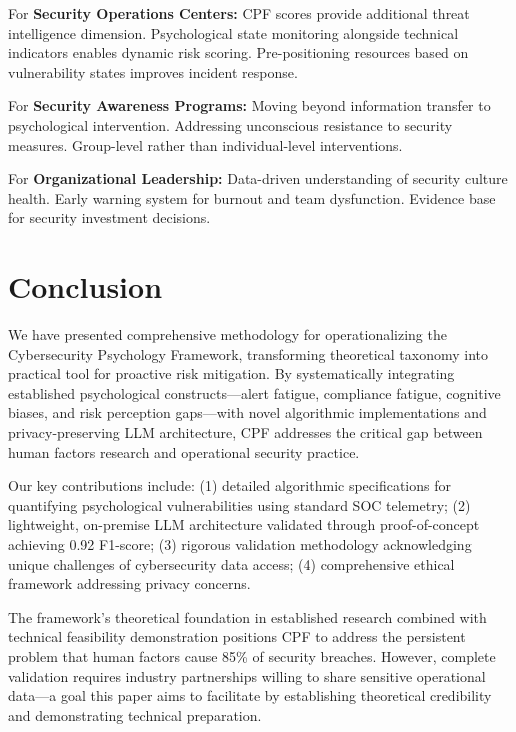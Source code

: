 \documentclass[11pt, a4paper]{article}
\begin{document}
For \textbf{Security Operations Centers:} CPF scores provide additional threat intelligence dimension. Psychological state monitoring alongside technical indicators enables dynamic risk scoring. Pre-positioning resources based on vulnerability states improves incident response.

For \textbf{Security Awareness Programs:} Moving beyond information transfer to psychological intervention. Addressing unconscious resistance to security measures. Group-level rather than individual-level interventions.

For \textbf{Organizational Leadership:} Data-driven understanding of security culture health. Early warning system for burnout and team dysfunction. Evidence base for security investment decisions.

\section{Conclusion}
\label{sec:conclusion}

We have presented comprehensive methodology for operationalizing the Cybersecurity Psychology Framework, transforming theoretical taxonomy into practical tool for proactive risk mitigation. By systematically integrating established psychological constructs—alert fatigue, compliance fatigue, cognitive biases, and risk perception gaps—with novel algorithmic implementations and privacy-preserving LLM architecture, CPF addresses the critical gap between human factors research and operational security practice.

Our key contributions include: (1) detailed algorithmic specifications for quantifying psychological vulnerabilities using standard SOC telemetry; (2) lightweight, on-premise LLM architecture validated through proof-of-concept achieving 0.92 F1-score; (3) rigorous validation methodology acknowledging unique challenges of cybersecurity data access; (4) comprehensive ethical framework addressing privacy concerns.

The framework's theoretical foundation in established research\cite{acquisti2015privacy,stanton2016security,kahneman2011thinking,gupta2024alert} combined with technical feasibility demonstration positions CPF to address the persistent problem that human factors cause 85\% of security breaches. However, complete validation requires industry partnerships willing to share sensitive operational data—a goal this paper aims to facilitate by establishing theoretical credibility and demonstrating technical preparation.
\end{document}
